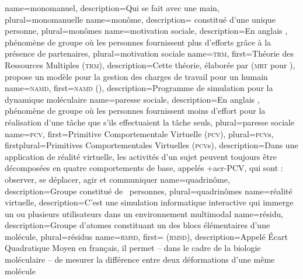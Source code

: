 %
{%
	name={monomanuel},%
	description={Qui se fait avec une main},%
	plural={monomanuelle}%
}
%
{%
	name={monôme},%
	description={ constitué d'une unique personne},%
	plural={monômes}%
}
%
{%
	name={motivation sociale},%
	description={En anglais  , phénomène de groupe où les personnes fournissent plus d'efforts grâce à la présence de partenaires},%
	plural={motivation sociale}%
}
%
{%
	name={\textsc{trm}},
	first={Théorie des Ressources Multiples (\textsc{trm})},%
	description={Cette théorie, élaborée par  (\textsc{mrt} pour ), propose un modèle pour la gestion des charges de travail pour un humain}
}
%
{%
	name={\textsc{namd}},%
	first={\textsc{namd} ()},%
	description={Programme de simulation pour la dynamique moléculaire }%
}
%
{%
	name={paresse sociale},%
	description={En anglais  , phénomène de groupe où les personnes fournissent moins d'effort pour la réalisation d'une tâche que s'ils effectuaient la tâche seuls},%
	plural={paresse sociale}%
}
%
{%
	name={\textsc{pcv}},
	first={Primitive Comportementale Virtuelle (\textsc{pcv})},%
	plural={\textsc{pcv}s},%
	firstplural={Primitives Comportementales Virtuelles (\textsc{pcv}s)},%
	description={Dans une application de réalité virtuelle, les activités d'un sujet peuvent toujours être décomposées en quatre comportements de base, appelés \myacro+{acr-PCV}, qui sont : observer, se déplacer, agir et communiquer }
}
%
{%
	name={quadrinôme},%
	description={Groupe constitué de ~personnes},%
	plural={quadrinômes}%
}
%
{%
	name={réalité virtuelle},%
	description={C'est une simulation informatique interactive qui immerge un ou plusieurs utilisateurs dans un environnement multimodal}%
}
%
{%
	name={résidu},%
	description={Groupe d'atomes constituant un des blocs élémentaires d'une molécule},%
	plural={résidus}%
}
%
{%
	name={\textsc{rmsd}},%
	first={ (\textsc{rmsd})},%
	description={Appelé Écart Quadratique Moyen en français, il permet -- dans le cadre de la biologie moléculaire -- de mesurer la différence entre deux déformations d'une même molécule}%
}
